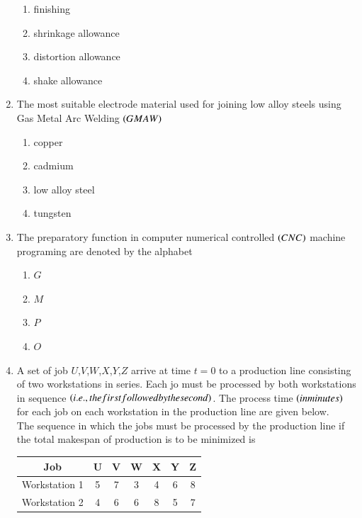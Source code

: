 \documentclass[journal]{IEEEtran}
\begin{document}
\begin{enumerate}
\begin{enumerate}
    \item finishing\\
    \item shrinkage allowance\\
    \item distortion allowance\\
    \item shake allowance   
\end{enumerate}
   \item The most suitable electrode material used for joining low alloy steels using Gas Metal Arc Welding $\left(GMAW\right)$\\
 \begin{enumerate}
   \item copper\\
   \item cadmium\\
   \item low alloy steel\\
   \item tungsten
 \end{enumerate}
 \item The preparatory function in computer numerical controlled $\left(CNC\right)$ machine programing are denoted by the alphabet\\
 \begin{enumerate}
     \item $G$\\
     \item $M$\\
     \item $P$\\
     \item $O$
 \end{enumerate}
 \item A set of job $U$,$V$,$W$,$X$,$Y$,$Z$ arrive at time $t=0$ to a production line consisting of two workstations in series. Each jo must be processed by both workstations in sequence $\left(i.e., the first followed by the second\right)$. The process time $\left(in minutes\right)$ for each job on each workstation in the production line are given below.\\

 The sequence in which the jobs must be processed by the production line if the total makespan of production is to be minimized is\\
\begin{table}[h!]
\centering
\begin{tabular}{|c|c|c|c|c|c|c|}
\hline
\textbf{Job} & \textbf{U} & \textbf{V} & \textbf{W} & \textbf{X} & \textbf{Y} & \textbf{Z} \\ \hline
Workstation 1 & 5 & 7 & 3 & 4 & 6 & 8 \\ \hline
Workstation 2 & 4 & 6 & 6 & 8 & 5 & 7 \\ \hline
\end{tabular}
\end{table}
 

\end{enumerate}
\end{document}
